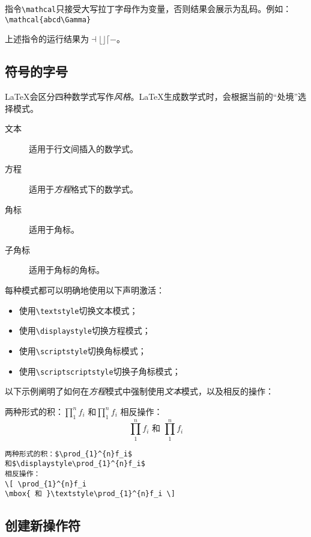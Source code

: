 \begin{exclamation}
指令\verb|\mathcal|只接受大写拉丁字母作为变量，否则结果会展示为乱码。例如：\\
\verb|\mathcal{abcd\Gamma}|

上述指令的运行结果为$\dashv \lfloor \rfloor \lceil -$。
\end{exclamation}

\subsection{符号的字号}

\LaTeX 会区分四种数学式写作\emph{风格}。\LaTeX 生成数学式时，会根据当前的“处境”选择模式。

\begin{description}
  \item[文本] 适用于行文间插入的数学式。
  \item[方程] 适用于\emph{方程}格式下的数学式。
  \item[角标] 适用于角标。
  \item[子角标] 适用于角标的角标。 
\end{description}

每种模式都可以明确地使用以下声明激活：

\begin{itemize}
  \item 使用\verb|\textstyle|切换文本模式；
  \item 使用\verb|\displaystyle|切换方程模式；
  \item 使用\verb|\scriptstyle|切换角标模式；
  \item 使用\verb|\scriptscriptstyle|切换子角标模式；
\end{itemize}

以下示例阐明了如何在\emph{方程}模式中强制使用\emph{文本}模式，以及相反的操作：

\begin{codelist}[3.24]{
两种形式的积：$\prod_{1}^{n}f_i$
和$\displaystyle\prod_{1}^{n}f_i$
相反操作：
\[ \prod_{1}^{n}f_i
\mbox{ 和 }\textstyle\prod_{1}^{n}f_i \]
}
\begin{verbatim}
两种形式的积：$\prod_{1}^{n}f_i$
和$\displaystyle\prod_{1}^{n}f_i$
相反操作：
\[ \prod_{1}^{n}f_i
\mbox{ 和 }\textstyle\prod_{1}^{n}f_i \]\end{verbatim}
\end{codelist}

\subsection{创建新操作符}

